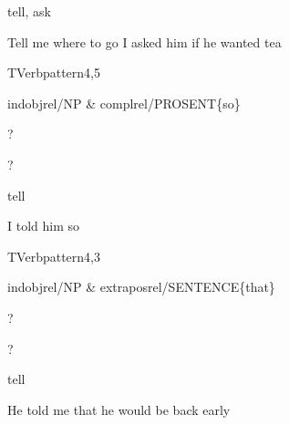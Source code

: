 
\begin{thetadescr}
\evitem tell, ask
\esitem
     \begin{examples}
        \example Tell me where to go
        \example I asked him if he wanted tea
     \end{examples}
\end{thetadescr}


\newpage
{}
\begin{vpattern}
 TVerbpattern4,5
\csritem \mbox{}\\
     \begin{csr}
      indobjrel/NP & complrel/PROSENT\{so\}
     \end{csr}
\remarksitem
\end{vpattern}


\begin{thetadescr}
\evitem ?
\esitem
     \begin{examples}
        \example ?
     \end{examples}
\end{thetadescr}



\begin{thetadescr}
\evitem tell
\esitem
     \begin{examples}
        \example I told him so
     \end{examples}
\end{thetadescr}


\newpage
{}
\begin{vpattern}
 TVerbpattern4,3
\csritem \mbox{}\\
     \begin{csr}
      indobjrel/NP & extraposrel/SENTENCE\{that\}
     \end{csr}
\remarksitem
\end{vpattern}


\begin{thetadescr}
\evitem ?
\esitem
     \begin{examples}
        \example ?
     \end{examples}
\end{thetadescr}



\begin{thetadescr}
\evitem tell
\esitem
     \begin{examples}
        \example He told me that he would be back early
     \end{examples}
\end{thetadescr}


